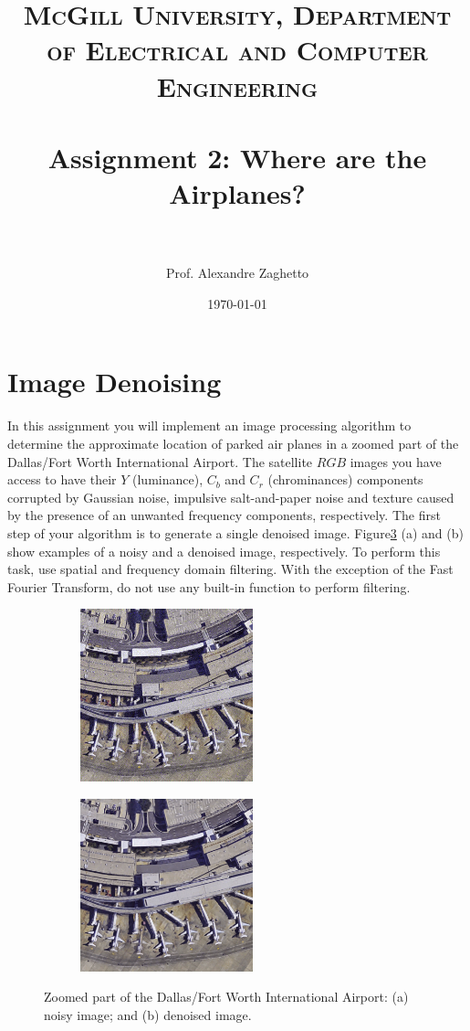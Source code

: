 \documentclass[paper=a4, fontsize=11pt]{scrartcl} %
\title{	
\normalfont \normalsize 
\textsc{McGill University, Department of Electrical and Computer Engineering} \\ [25pt] %
\horrule{0.5pt} \\[0.4cm] %
\huge Assignment 2: Where are the Airplanes? \\ %
\horrule{2pt} \\[0.5cm] %
}
\author{Prof. Alexandre Zaghetto} %
\date{\normalsize\today} %
\numberwithin{equation}{section} %
\numberwithin{figure}{section} %
\numberwithin{table}{section} %
\begin{document}
\maketitle %


\section{Image Denoising}
\label{denoise}

In this assignment you will implement an image processing algorithm to determine the approximate location of parked air planes in a zoomed part of the Dallas/Fort Worth International Airport. The satellite $RGB$ images you have access to have their $Y$ (luminance), $C_b$ and $C_r$ (chrominances) components corrupted by Gaussian noise, impulsive salt-and-paper noise and texture caused by the presence of an unwanted frequency components, respectively. The first step of your algorithm is to generate a single denoised image. Figure\ref{fig:airport} (a) and (b) show examples of a noisy and a denoised image, respectively. To perform this task, use spatial and frequency domain filtering. With the exception of the Fast Fourier Transform, do not use any built-in function to perform filtering.


\begin{figure}[h]
	\centering
	\begin{subfigure}[b]{0.35\textwidth}
		\includegraphics[width=5cm]{noisy.png}
		\label{fig:noisy}
	\end{subfigure}
	 \hspace{2eM}
	 \centering
	\begin{subfigure}[b]{0.35\textwidth}
	\includegraphics[width=5cm]{denoised.png}
	\label{fig:denoised}
	\end{subfigure}
	\caption{Zoomed part of the Dallas/Fort Worth International Airport: (a) noisy image; and (b) denoised image.}
	\label{fig:airport}
\end{figure}
\end{document}
